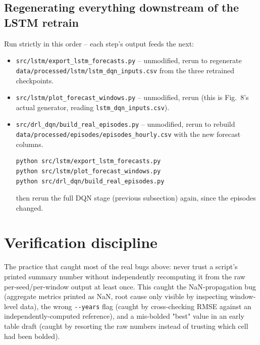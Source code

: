 \documentclass[11pt]{article}
\begin{document}
\subsection{Regenerating everything downstream of the LSTM retrain}
Run strictly in this order -- each step's output feeds the next:
\begin{itemize}
  \item \texttt{src/lstm/export\_lstm\_forecasts.py} -- unmodified, rerun to regenerate
  \texttt{data/processed/lstm/lstm\_dqn\_inputs.csv} from the three retrained checkpoints.
  \item \texttt{src/lstm/plot\_forecast\_windows.py} -- unmodified, rerun (this is Fig.~8's
  actual generator, reading \texttt{lstm\_dqn\_inputs.csv}).
  \item \texttt{src/drl\_dqn/build\_real\_episodes.py} -- unmodified, rerun to rebuild
  \texttt{data/processed/episodes/episodes\_hourly.csv} with the new forecast columns.
  \begin{verbatim}
python src/lstm/export_lstm_forecasts.py
python src/lstm/plot_forecast_windows.py
python src/drl_dqn/build_real_episodes.py
  \end{verbatim}
  then rerun the full DQN stage (previous subsection) again, since the episodes changed.
\end{itemize}

\section{Verification discipline}
The practice that caught most of the real bugs above: never trust a script's printed
summary number without independently recomputing it from the raw per-seed/per-window
output at least once. This caught the NaN-propagation bug (aggregate metrics printed as
NaN, root cause only visible by inspecting window-level data), the wrong
\texttt{-{}-years} flag (caught by cross-checking RMSE against an independently-computed
reference), and a mis-bolded "best" value in an early table draft (caught by resorting
the raw numbers instead of trusting which cell had been bolded).
\end{document}
